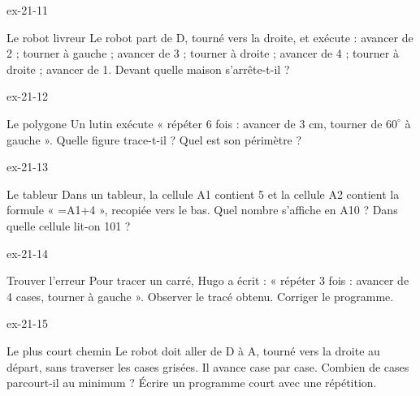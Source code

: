 \begin{blocLivre}{ex-21-11}\begin{exercice}[3]{Le robot livreur}
Le robot part de D, tourné vers la droite, et exécute : avancer de 2 ; tourner à gauche ; avancer de 3 ; tourner à droite ; avancer de 4 ; tourner à droite ; avancer de 1. Devant quelle maison s’arrête-t-il ?
\label{fig-ex-21-11}
\end{exercice}\end{blocLivre}
\begin{blocLivre}{ex-21-12}\begin{exercice}[3]{Le polygone}
Un lutin exécute « répéter 6 fois : avancer de 3 cm, tourner de $60^\circ$ à gauche ». Quelle figure trace-t-il ? Quel est son périmètre ?
\label{fig-ex-21-12}
\end{exercice}\end{blocLivre}
\begin{blocLivre}{ex-21-13}\begin{exercice}[3]{Le tableur}
Dans un tableur, la cellule A1 contient 5 et la cellule A2 contient la formule « =A1+4 », recopiée vers le bas. Quel nombre s’affiche en A10 ? Dans quelle cellule lit-on 101 ?
\end{exercice}\end{blocLivre}
\begin{blocLivre}{ex-21-14}\begin{exercice}[3]{Trouver l’erreur}
Pour tracer un carré, Hugo a écrit : « répéter 3 fois : avancer de 4 cases, tourner à gauche ». Observer le tracé obtenu. Corriger le programme.
\label{fig-ex-21-14}
\end{exercice}\end{blocLivre}
\begin{blocLivre}{ex-21-15}\begin{exercice}[3]{Le plus court chemin}
Le robot doit aller de D à A, tourné vers la droite au départ, sans traverser les cases grisées. Il avance case par case. Combien de cases parcourt-il au minimum ? Écrire un programme court avec une répétition.
\label{fig-ex-21-15}
\end{exercice}\end{blocLivre}

\clearpage
